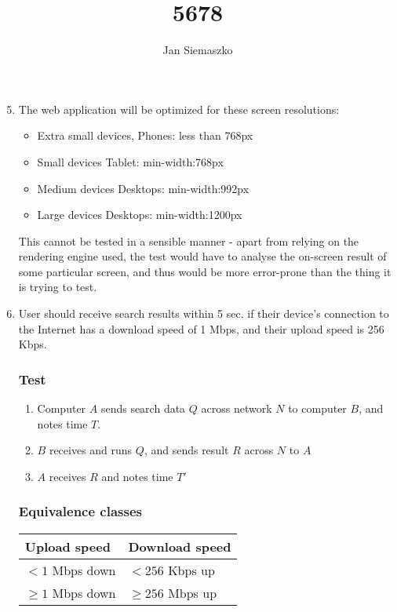 \documentclass[10pt,a4paper]{report}
\author{Jan Siemaszko}
\title{5678}
\begin{document}
\begin{enumerate}
    \setcounter{enumi}{4}
    \item The web application will be optimized for these screen resolutions:
        \begin{itemize}
            \item Extra small devices, Phones: less than 768px
            \item Small devices Tablet: min-width:768px
            \item Medium devices Desktops: min-width:992px
            \item Large devices Desktops: min-width:1200px
        \end{itemize}
        
        This cannot be tested in a sensible manner - apart from relying on the rendering engine used, the test would have to analyse the on-screen result of some particular screen, and thus would be more error-prone than the thing it is trying to test.
        
    \item User should receive search results within 5 sec. if their device’s connection to
    the Internet has a download speed of 1 Mbps, and their upload speed is 256 Kbps.
        
        \subsubsection*{Test}
        \begin{enumerate}
            \item Computer $A$ sends search data $Q$ across network $N$ to computer $B$, and notes time $T$.
            \item $B$ receives and runs $Q$, and sends result $R$ across $N$ to $A$
            \item $A$ receives $R$ and notes time $T'$
        \end{enumerate}
        \subsubsection*{Equivalence classes}
        \begin{tabular}{|l|l|}
            \hline
            Upload speed & Download speed\\
            \hline
            $<1$ Mbps down & $<256$ Kbps up\\
            $\geq1$ Mbps down & $\geq 256$ Mbps up\\
            \hline
        \end{tabular}

\end{enumerate}
\end{document}
